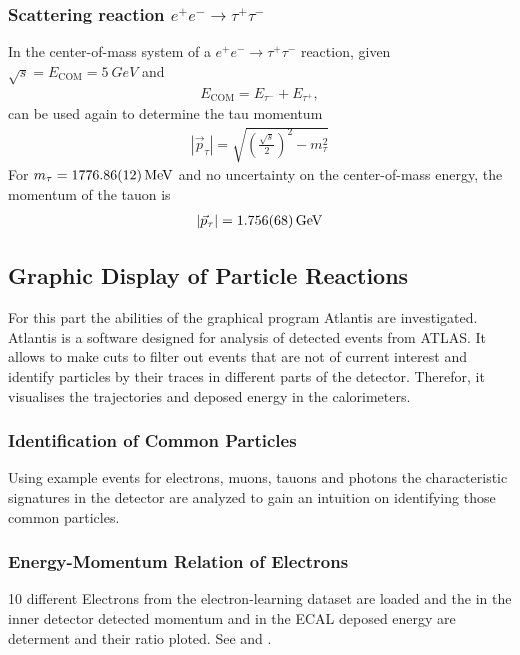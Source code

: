 \documentclass[sn-mathphys-num,icol]{sn-jnl}
\theoremstyle{thmstyleone}
\theoremstyle{thmstyletwo}
\theoremstyle{thmstylethree}
\begin{document}
\subsubsection{Scattering reaction $e^+e^-\rightarrow \tau^+\tau^-$}
In the center-of-mass system of a $e^+e^-\rightarrow \tau^+\tau^-$ reaction, given $\sqrt{s}=E_{\text{COM}}=\SI{5}{GeV}$ and
\begin{align}
	E_{\text{COM}}=E_{\tau^-}+E_{\tau^+},
\end{align}
 can be used again to determine the tau momentum
\begin{align}
	|\vec{p}_\tau| = \sqrt{\left(\frac{\sqrt{s}}{2}\right)^2-m^2_{\tau}}
\end{align}
For $m_{\tau}=\SI{1776.86+-0.12}{MeV}$ and no uncertainty on the center-of-mass energy, the momentum of the tauon is
\begin{align}
	|\vec{p}_{\tau}| = \SI{1.756+-0.068}{GeV}
\end{align}
\subsection{Graphic Display of Particle Reactions}
For this part the abilities of the graphical program Atlantis are investigated. Atlantis is a software designed for analysis of detected events from ATLAS. It allows to make cuts to filter out events that are not of current interest and identify particles by their traces in different parts of the detector. Therefor, it visualises the trajectories and deposed energy in the calorimeters.
\subsubsection{Identification of Common Particles}
Using example events for electrons, muons, tauons and photons the characteristic signatures in the detector are analyzed to gain an intuition on identifying those common particles.
\subsubsection{Energy-Momentum Relation of Electrons}
10 different Electrons from the electron-learning dataset are loaded and the in the inner detector detected momentum and in the ECAL deposed energy are determent and their ratio ploted. See  and .
\end{document}
